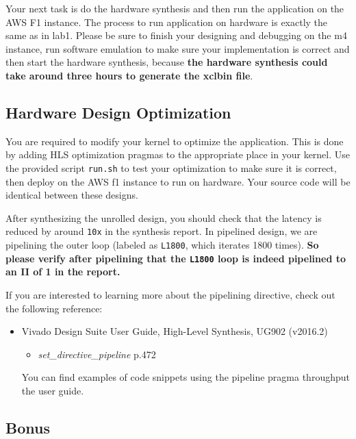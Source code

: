 \documentclass[paper=letter, fontsize=10pt]{scrartcl} %
\numberwithin{equation}{section} %
\numberwithin{figure}{section} %
\numberwithin{table}{section} %
\begin{document}
Your next task is do the hardware synthesis and then run the application on the AWS F1 instance. The process to run application on hardware is exactly the same as in lab1.
 Please be sure to finish your designing and debugging on the m4 instance, run software emulation to make sure your 
implementation is correct and then start the hardware synthesis, because \textbf{the hardware synthesis could take around three hours to generate the xclbin file}.


\subsection{Hardware Design Optimization}

You are required to modify your kernel to optimize the application. This is done by adding HLS optimization pragmas to the appropriate place in your kernel. 
Use the provided script \texttt{run.sh} to test your optimization to make sure it is correct, then deploy on the AWS f1 instance to run on hardware.
Your source code will be identical between these designs. 

After synthesizing the unrolled design, you should check that the latency is
reduced by around \texttt{10x} in the synthesis report. 
In pipelined design, we are pipelining the outer loop (labeled as \texttt{L1800}, which iterates 1800 times). 
\textbf{So please verify after pipelining that the \texttt{L1800} loop is indeed pipelined to an II of 1 in the report.}

If you are interested to learning more about the pipelining directive, check out the following reference:
\begin{itemize}
\item Vivado Design Suite User Guide, High-Level Synthesis, UG902 (v2016.2)~\cite{ug902}
\begin{itemize}
\item \textit{set\_directive\_pipeline} p.472
\end{itemize}
You can find examples of code snippets using the pipeline pragma throughput the user guide.
\end{itemize}

\subsection{Bonus}
\label{subsec:bonus}
\end{document}

